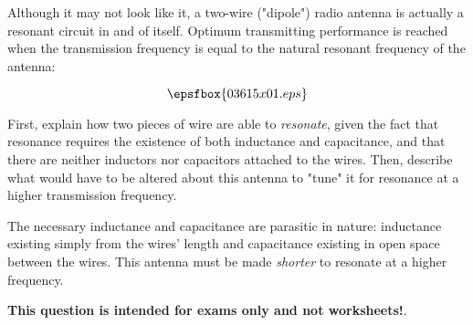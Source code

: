 

Although it may not look like it, a two-wire ("dipole") radio antenna is actually a resonant circuit in and of itself.  Optimum transmitting performance is reached when the transmission frequency is equal to the natural resonant frequency of the antenna:

$$\epsfbox{03615x01.eps}$$

First, explain how two pieces of wire are able to {\it resonate}, given the fact that resonance requires the existence of both inductance and capacitance, and that there are neither inductors nor capacitors attached to the wires.  Then, describe what would have to be altered about this antenna to "tune" it for resonance at a higher transmission frequency.







The necessary inductance and capacitance are parasitic in nature: inductance existing simply from the wires' length and capacitance existing in open space between the wires.  This antenna must be made {\it shorter} to resonate at a higher frequency.







{\bf This question is intended for exams only and not worksheets!}.



